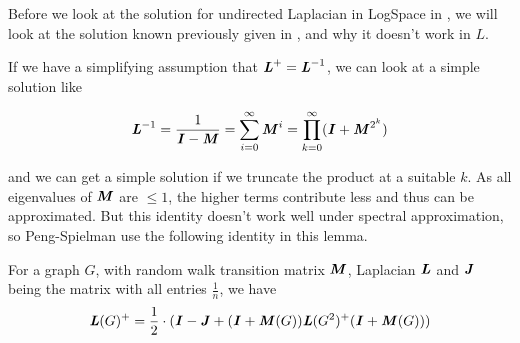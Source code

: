\documentclass{article}
\begin{document}
Before we look at the solution for undirected Laplacian in LogSpace in \cite{murtaghDerandomizationConnectivityUndirected2017}, we will look at the solution known previously given in \cite{peng2014efficient}, and why it doesn't work in $L$. 

If we have a simplifying assumption that $\boldsymbol{\mathit{L}}^+=\boldsymbol{\mathit{L}}^{-1}$, we can look at a simple solution like

$$\boldsymbol{\mathit{L}}^{-1}=\frac{1}{\boldsymbol{\mathit{I}}-\boldsymbol{\mathit{M}}}=\sum_{i=0}^\infty \boldsymbol{\mathit{M}}^i=\prod_{k=0}^\infty(\boldsymbol{\mathit{I}}+\boldsymbol{\mathit{M}}^{2^k})$$

and we can get a simple solution if we truncate the product at a suitable $k$. As all eigenvalues of $\boldsymbol{\mathit{M}}$ are $\leq 1$, the higher terms contribute less and thus can be approximated. But this identity doesn't work well under spectral approximation, so Peng-Spielman use the following identity in this lemma.

\begin{lemma}\label{identity}
    For a graph $G$, with random walk transition matrix $\boldsymbol{\mathit{M}}$, Laplacian $\boldsymbol{\mathit{L}}$ and $\boldsymbol{\mathit{J}}$ being the matrix with all entries $\frac{1}{n}$, we have
    $$\boldsymbol{\mathit{L}}(G)^{+}=\frac{1}{2}\cdot(\boldsymbol{\mathit{I}}-\boldsymbol{\mathit{J}}+(\boldsymbol{\mathit{I}}+\boldsymbol{\mathit{M}}(G))\boldsymbol{\mathit{L}}(G^2)^+(\boldsymbol{\mathit{I}}+\boldsymbol{\mathit{M}}(G)))$$
\end{lemma}
\end{document}
